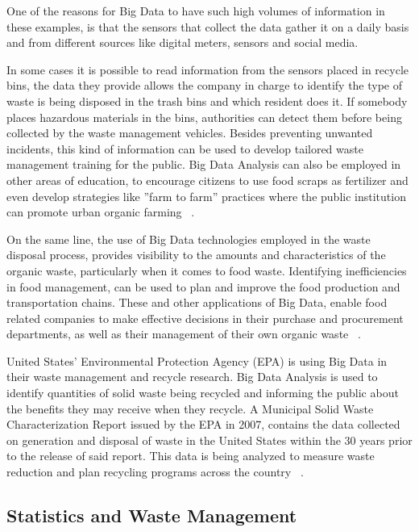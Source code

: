 \documentclass[sigconf]{acmart}
\begin{document}
One of the reasons for Big Data to have such high volumes of information in these examples, is that the sensors that collect the data gather it on a daily basis and from different sources like digital meters, sensors and social media. 

In some cases it is possible to read information from the sensors placed in recycle bins, the data they provide allows the company in charge to identify the type of waste is being disposed in the trash bins and which resident does it. If somebody places hazardous materials in the bins, authorities can detect them before  being collected by the waste management vehicles. Besides preventing unwanted incidents, this kind of information can be used to develop tailored waste management training for the public. Big Data Analysis can also be employed in other areas of education, to encourage citizens to use food scraps as fertilizer and even develop strategies like ''farm to farm'' practices where the public institution can promote urban organic farming ~\cite{james2012}.

On the same line, the use of Big Data technologies employed in the  waste disposal process, provides visibility to the amounts and characteristics of the organic waste, particularly when it comes to food waste. Identifying inefficiencies in food management, can be used to plan and improve the food production and transportation chains. These and other applications of Big Data, enable food related companies to make effective decisions in their purchase and procurement departments, as well as their management of their own organic waste ~\cite{frank2016}.

United States' Environmental Protection Agency (EPA) is using Big Data in their waste management and recycle research. Big Data Analysis is used to identify quantities of solid waste being recycled and informing the public about the benefits they may receive when they recycle. A Municipal Solid Waste Characterization Report issued by the EPA in 2007, contains the data collected on generation and disposal of waste in the United States within the 30 years prior to the release of said report. This data is being analyzed to measure waste reduction and plan recycling programs across the country ~\cite{epaRecycleBenefits2007}.

\subsection{Statistics and Waste Management}
\end{document}
